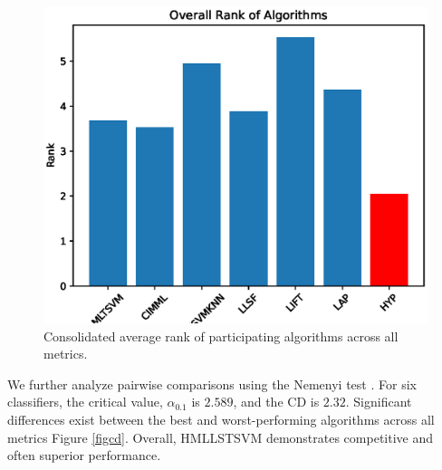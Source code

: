\documentclass[12pt,a4paper,oneside,english]{report}
\begin{document}
\begin{figure}[h!]
    \begin{center}
    \centering
        \includegraphics[width=0.5\linewidth]{Figures/chp3/rank.eps}  
        \caption{Consolidated average rank of participating algorithms across all metrics.}
    \label{avgrank}
    \end{center}
    \end{figure}
We further analyze pairwise comparisons using the Nemenyi test \cite{demvsar2006statistical}. For six classifiers, the critical value, $\alpha_{0.1}$ is $2.589$, and the CD is $2.32$. Significant differences exist between the best and worst-performing algorithms across all metrics Figure \ref{figcd}.  Overall, HMLLSTSVM demonstrates competitive and often superior performance.
\end{document}
